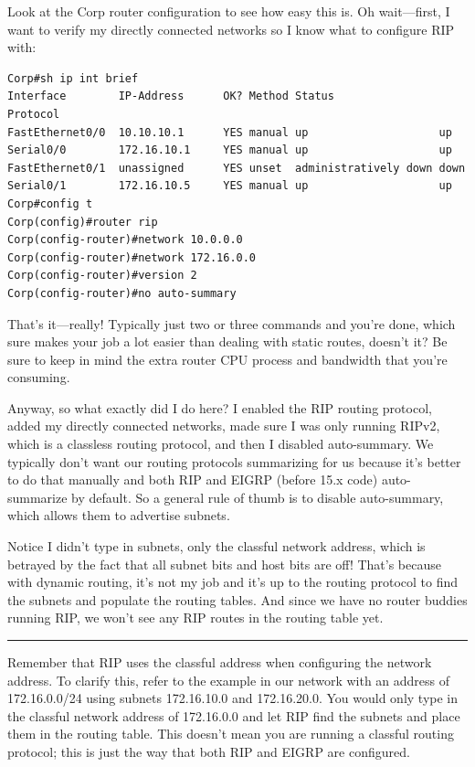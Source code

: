 Look at the Corp router configuration to see how easy this is. Oh
wait---first, I want to verify my directly connected networks so I know
what to configure RIP with:

\begin{verbatim}
Corp#sh ip int brief
Interface        IP-Address      OK? Method Status                Protocol
FastEthernet0/0  10.10.10.1      YES manual up                    up
Serial0/0        172.16.10.1     YES manual up                    up
FastEthernet0/1  unassigned      YES unset  administratively down down
Serial0/1        172.16.10.5     YES manual up                    up
Corp#config t
Corp(config)#router rip
Corp(config-router)#network 10.0.0.0
Corp(config-router)#network 172.16.0.0
Corp(config-router)#version 2
Corp(config-router)#no auto-summary
\end{verbatim}

\protect\hypertarget{c09.xhtmlux5cux23Page_394}{}{}That's it---really!
Typically just two or three commands and you're done, which sure makes
your job a lot easier than dealing with static routes, doesn't it? Be
sure to keep in mind the extra router CPU process and bandwidth that
you're consuming.

Anyway, so what exactly did I do here? I enabled the RIP routing
protocol, added my directly connected networks, made sure I was only
running RIPv2, which is a classless routing protocol, and then I
disabled auto-summary. We typically don't want our routing protocols
summarizing for us because it's better to do that manually and both RIP
and EIGRP (before 15.x code) auto-summarize by default. So a general
rule of thumb is to disable auto-summary, which allows them to advertise
subnets.

Notice I didn't type in subnets, only the classful network address,
which is betrayed by the fact that all subnet bits and host bits are
off! That's because with dynamic routing, it's not my job and it's up to
the routing protocol to find the subnets and populate the routing
tables. And since we have no router buddies running RIP, we won't see
any RIP routes in the routing table yet.

\begin{center}\rule{0.5\linewidth}{0.5pt}\end{center}

Remember that RIP uses the classful
address when configuring the network address. To clarify this, refer to
the example in our network with an address of 172.16.0.0/24 using
subnets 172.16.10.0 and 172.16.20.0. You would only type in the classful
network address of 172.16.0.0 and let RIP find the subnets and place
them in the routing table. This doesn't mean you are running a classful
routing protocol; this is just the way that both RIP and EIGRP are
configured.

